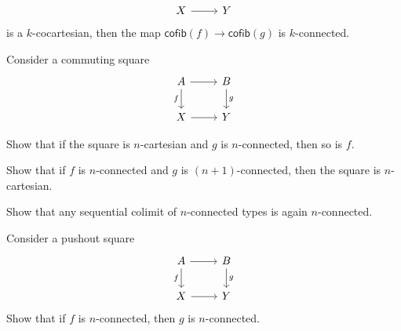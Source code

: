 \begin{exercises}
\begin{equation*}
\begin{tikzcd}
X \arrow[r] & Y
\end{tikzcd}
\end{equation*}
is a $k$-cocartesian, then the map $\mathsf{cofib}(f)\to \mathsf{cofib}(g)$ is $k$-connected.
\item Consider a commuting square
\begin{equation*}
\begin{tikzcd}
A \arrow[d,swap,"f"] \arrow[r] & B \arrow[d,"g"] \\
X \arrow[r] & Y
\end{tikzcd}
\end{equation*}
\begin{subexenum}
\item Show that if the square is $n$-cartesian and $g$ is $n$-connected, then so is $f$.
\item Show that if $f$ is $n$-connected and $g$ is $(n+1)$-connected, then the square is $n$-cartesian. 
\end{subexenum}
\item Show that any sequential colimit of $n$-connected types is again $n$-connected.
\item Consider a pushout square
\begin{equation*}
\begin{tikzcd}
A \arrow[d,swap,"f"] \arrow[r] & B \arrow[d,"g"] \\
X \arrow[r] & Y
\end{tikzcd}
\end{equation*}
Show that if $f$ is $n$-connected, then $g$ is $n$-connected.
\end{exercises}
